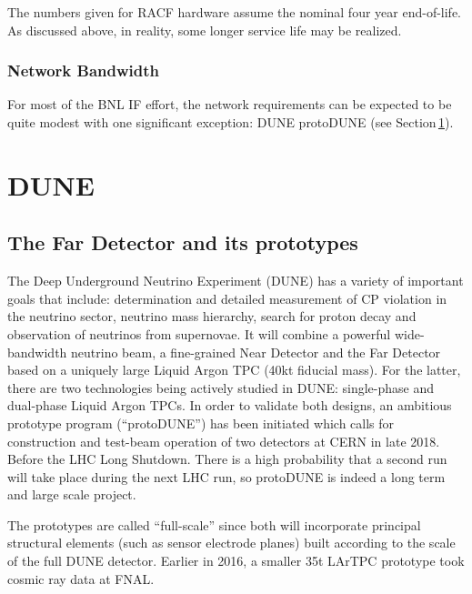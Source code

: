 \documentclass[pdftex,12pt,letter]{article}
\begin{document}
The numbers given for RACF hardware assume the nominal four year
end-of-life.
As discussed above, in reality, some longer service life may be
realized.


\subsubsection{Network Bandwidth}
For most of the BNL IF effort, the network requirements can be expected to be quite modest with one
significant exception: DUNE protoDUNE (see Section\,\ref{sec:dune}).


\pagebreak
\section{DUNE}
\label{sec:dune}
\subsection{The Far Detector and its prototypes}
The Deep Underground Neutrino Experiment (DUNE) has a variety of important goals that
include:
determination and detailed measurement of CP violation in the neutrino sector,
neutrino mass hierarchy, search for proton decay and observation of neutrinos from supernovae.
It will combine a powerful wide-bandwidth neutrino beam, a fine-grained Near Detector and
the Far Detector based on a uniquely large Liquid Argon TPC (40kt fiducial mass). For the latter,
there are two technologies being actively studied in DUNE: single-phase and dual-phase Liquid Argon TPCs.
In order to validate both designs, an ambitious prototype program (``protoDUNE'') has been initiated which calls
for construction and test-beam operation of two detectors at CERN in late 2018. Before the LHC Long Shutdown.
There is a high probability that a second run will take place during the next LHC run, so protoDUNE is indeed a long
term and large scale project.

The  prototypes are called ``full-scale''
since both will incorporate principal structural elements (such as sensor electrode planes) built according to the scale
of the full DUNE detector. Earlier in 2016, a smaller 35t LArTPC prototype took cosmic ray data at FNAL.
\end{document}
